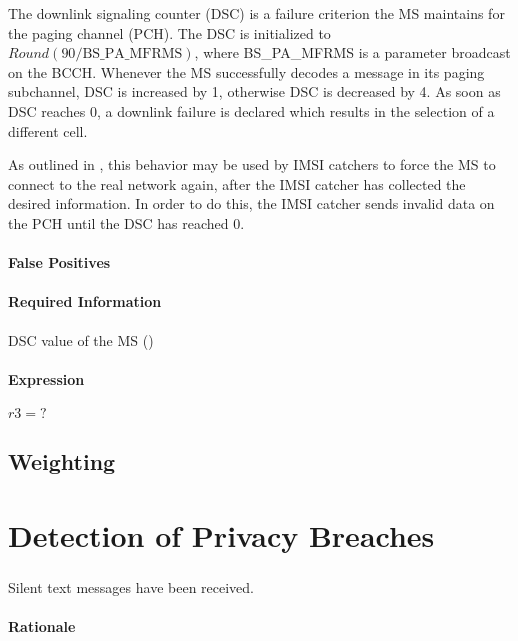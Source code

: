 \documentclass[a4paper,11pt,notitlepage,bigheadings,oneside]{scrartcl}
\begin{document}
The downlink signaling counter (DSC) is a failure criterion the MS maintains
for the paging channel (PCH). The DSC is initialized to
$Round(90/\text{BS\_PA\_MFRMS})$, where BS\_PA\_MFRMS is a parameter broadcast
on the BCCH. Whenever the MS successfully decodes a message in its paging
subchannel, DSC is increased by 1, otherwise DSC is decreased by 4. As soon as
DSC reaches 0, a downlink failure is declared which results in the selection of
a different cell.

As outlined in \cite{bott2000verfahren}, this behavior may be used by IMSI
catchers to force the MS to connect to the real network again, after the IMSI
catcher has collected the desired information. In order to do this, the IMSI
catcher sends invalid data on the PCH until the DSC has reached 0.

\paragraph{False Positives}


\paragraph{Required Information}

DSC value of the MS ()

\paragraph{Expression}

$r3 = ?$

\subsection{Weighting}

\section{Detection of Privacy Breaches}
\label{sec:detection_of_privacy_breaches}

\subsubsection{}

Silent text messages have been received.

\paragraph{Rationale}
\end{document}

